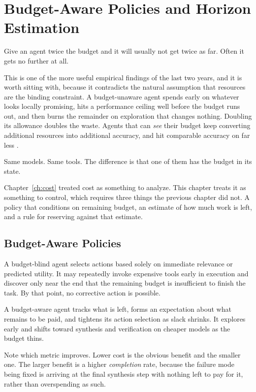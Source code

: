 \chapter{Budget-Aware Policies and Horizon Estimation}
\label{ch:budgets}

Give an agent twice the budget and it will usually not get twice as far. Often it gets no further at all.

This is one of the more useful empirical findings of the last two years, and it is worth sitting with, because it contradicts the natural assumption that resources are the binding constraint. A budget-unaware agent spends early on whatever looks locally promising, hits a performance ceiling well before the budget runs out, and then burns the remainder on exploration that changes nothing. Doubling its allowance doubles the waste. Agents that can \emph{see} their budget keep converting additional resources into additional accuracy, and hit comparable accuracy on far less \cite{bats2025, budgettooluse2026}.

Same models. Same tools. The difference is that one of them has the budget in its state.

Chapter~\ref{ch:cost} treated cost as something to analyze. This chapter treats it as something to control, which requires three things the previous chapter did not. A policy that conditions on remaining budget, an estimate of how much work is left, and a rule for reserving against that estimate.

\section{Budget-Aware Policies}

A budget-blind agent selects actions based solely on immediate relevance or predicted utility. It may repeatedly invoke expensive tools early in execution and discover only near the end that the remaining budget is insufficient to finish the task. By that point, no corrective action is possible.

A budget-aware agent tracks what is left, forms an expectation about what remains to be paid, and tightens its action selection as slack shrinks. It explores early and shifts toward synthesis and verification on cheaper models as the budget thins.

Note which metric improves. Lower cost is the obvious benefit and the smaller one. The larger benefit is a higher \emph{completion} rate, because the failure mode being fixed is arriving at the final synthesis step with nothing left to pay for it, rather than overspending as such.

